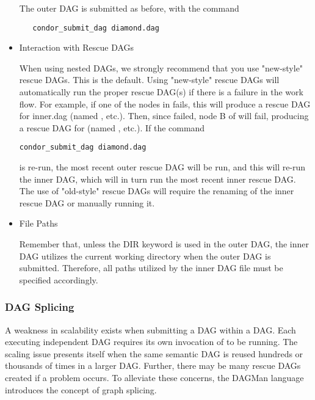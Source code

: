 \begin{itemize}
The outer DAG is submitted as before, with the command
\begin{verbatim}
   condor_submit_dag diamond.dag
\end{verbatim}

\item{Interaction with Rescue DAGs}

When using nested DAGs, we strongly recommend that you use
"new-style" rescue DAGs. This is the default.  Using "new-style"
rescue DAGs will automatically run the proper rescue DAG(s) if
there is a failure in the work flow.  For example, if one of the
nodes in  fails, this will produce a rescue
DAG for inner.dag (named , etc.).  Then,
since  failed, node B of  will fail,
producing a rescue DAG for 
(named , etc.).  
If the command
\begin{verbatim}
condor_submit_dag diamond.dag
\end{verbatim}
is re-run, the most recent outer rescue
DAG will be run, and this will re-run the inner DAG, which will
in turn run the most recent inner rescue DAG.  
The use of
"old-style" rescue DAGs will require the renaming of the 
inner rescue DAG or manually running it.

\item{File Paths}

Remember that, unless the DIR keyword is used in the outer DAG,
the inner DAG utilizes the current working directory when the outer DAG
is submitted.
Therefore, all paths utilized by the inner DAG file
must be specified accordingly.

\end{itemize}

\subsubsection{\label{sec:DAGSplicing}DAG Splicing}

A weakness in scalability exists when submitting a DAG within a DAG.
Each executing independent DAG requires its own invocation of
 to be running.
The scaling issue presents itself when
the same semantic DAG is reused hundreds or thousands of times
in a larger DAG.
Further, there may be many rescue DAGs created if a problem occurs.
To alleviate these concerns, the DAGMan language introduces
the concept of graph splicing.

